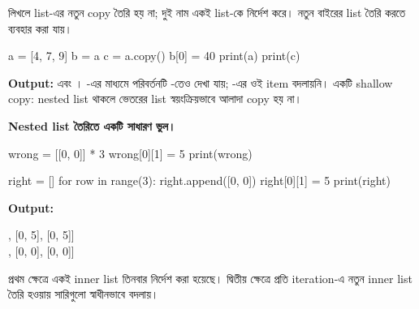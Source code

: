 
 লিখলে list-এর নতুন copy তৈরি হয় না; দুই নাম একই list-কে
নির্দেশ করে। নতুন বাইরের list তৈরি করতে  ব্যবহার করা যায়।
\begin{pythoncode}
a = [4, 7, 9]
b = a
c = a.copy()
b[0] = 40
print(a)
print(c)
\end{pythoncode}
\textbf{Output:} \py{[40, 7, 9]} এবং \py{[4, 7, 9]}।
-এর মাধ্যমে পরিবর্তনটি -তেও দেখা যায়; -এর ওই item
বদলায়নি।  একটি shallow copy: nested list থাকলে ভেতরের list
স্বয়ংক্রিয়ভাবে আলাদা copy হয় না।

\textbf{Nested list তৈরিতে একটি সাধারণ ভুল।}
\begin{pythoncode}
wrong = [[0, 0]] * 3
wrong[0][1] = 5
print(wrong)

right = []
for row in range(3):
    right.append([0, 0])
right[0][1] = 5
print(right)
\end{pythoncode}
\textbf{Output:}
\begin{codebox}\begin{english}\ttfamily
[[0, 5], [0, 5], [0, 5]]\\\relax
[[0, 5], [0, 0], [0, 0]]
\end{english}\end{codebox}
প্রথম ক্ষেত্রে একই inner list তিনবার নির্দেশ করা হয়েছে। দ্বিতীয় ক্ষেত্রে
প্রতি iteration-এ নতুন inner list তৈরি হওয়ায় সারিগুলো স্বাধীনভাবে বদলায়।

